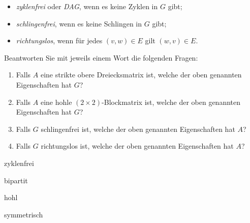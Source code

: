 \documentclass[12pt]{article}
\begin{document}
\begin{aufgabe}[4]
\begin{itemize}
    \item \emph{zyklenfrei} oder \emph{DAG}, wenn es keine Zyklen in $G$ gibt;
    \item \emph{schlingenfrei}, wenn es keine Schlingen in $G$ gibt;
    \item \emph{richtungslos}, wenn für jedes $(v, w) \in E$ gilt $(w, v) \in E$. %
  \end{itemize}
  Beantworten Sie mit jeweils einem Wort die folgenden Fragen:
  \begin{enumerate}
    \item Falls $A$ eine strikte obere Dreiecksmatrix ist, welche der oben genannten Eigenschaften hat $G$?
    \item Falls $A$ eine hohle $(2 \times 2)$-Blockmatrix ist, welche der oben genannten Eigenschaften hat $G$?
    \item Falls $G$ schlingenfrei ist, welche der oben genannten Eigenschaften hat $A$?
    \item Falls $G$ richtungslos ist, welche der oben genannten Eigenschaften hat $A$?
  \end{enumerate}
\end{aufgabe}

\begin{loesung}
  \begin{enumerate*}[itemjoin={{\qquad}}]
    \item zyklenfrei
    \item bipartit
    \item hohl
    \item symmetrisch
  \end{enumerate*}
\end{loesung}

\end{document}
